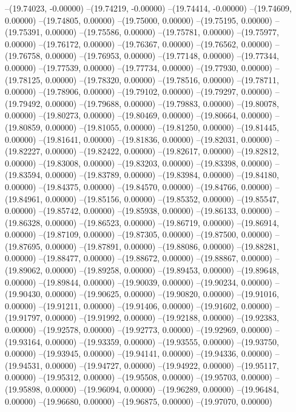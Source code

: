 --(19.74023, -0.00000)
--(19.74219, -0.00000)
--(19.74414, -0.00000)
--(19.74609, 0.00000)
--(19.74805, 0.00000)
--(19.75000, 0.00000)
--(19.75195, 0.00000)
--(19.75391, 0.00000)
--(19.75586, 0.00000)
--(19.75781, 0.00000)
--(19.75977, 0.00000)
--(19.76172, 0.00000)
--(19.76367, 0.00000)
--(19.76562, 0.00000)
--(19.76758, 0.00000)
--(19.76953, 0.00000)
--(19.77148, 0.00000)
--(19.77344, 0.00000)
--(19.77539, 0.00000)
--(19.77734, 0.00000)
--(19.77930, 0.00000)
--(19.78125, 0.00000)
--(19.78320, 0.00000)
--(19.78516, 0.00000)
--(19.78711, 0.00000)
--(19.78906, 0.00000)
--(19.79102, 0.00000)
--(19.79297, 0.00000)
--(19.79492, 0.00000)
--(19.79688, 0.00000)
--(19.79883, 0.00000)
--(19.80078, 0.00000)
--(19.80273, 0.00000)
--(19.80469, 0.00000)
--(19.80664, 0.00000)
--(19.80859, 0.00000)
--(19.81055, 0.00000)
--(19.81250, 0.00000)
--(19.81445, 0.00000)
--(19.81641, 0.00000)
--(19.81836, 0.00000)
--(19.82031, 0.00000)
--(19.82227, 0.00000)
--(19.82422, 0.00000)
--(19.82617, 0.00000)
--(19.82812, 0.00000)
--(19.83008, 0.00000)
--(19.83203, 0.00000)
--(19.83398, 0.00000)
--(19.83594, 0.00000)
--(19.83789, 0.00000)
--(19.83984, 0.00000)
--(19.84180, 0.00000)
--(19.84375, 0.00000)
--(19.84570, 0.00000)
--(19.84766, 0.00000)
--(19.84961, 0.00000)
--(19.85156, 0.00000)
--(19.85352, 0.00000)
--(19.85547, 0.00000)
--(19.85742, 0.00000)
--(19.85938, 0.00000)
--(19.86133, 0.00000)
--(19.86328, 0.00000)
--(19.86523, 0.00000)
--(19.86719, 0.00000)
--(19.86914, 0.00000)
--(19.87109, 0.00000)
--(19.87305, 0.00000)
--(19.87500, 0.00000)
--(19.87695, 0.00000)
--(19.87891, 0.00000)
--(19.88086, 0.00000)
--(19.88281, 0.00000)
--(19.88477, 0.00000)
--(19.88672, 0.00000)
--(19.88867, 0.00000)
--(19.89062, 0.00000)
--(19.89258, 0.00000)
--(19.89453, 0.00000)
--(19.89648, 0.00000)
--(19.89844, 0.00000)
--(19.90039, 0.00000)
--(19.90234, 0.00000)
--(19.90430, 0.00000)
--(19.90625, 0.00000)
--(19.90820, 0.00000)
--(19.91016, 0.00000)
--(19.91211, 0.00000)
--(19.91406, 0.00000)
--(19.91602, 0.00000)
--(19.91797, 0.00000)
--(19.91992, 0.00000)
--(19.92188, 0.00000)
--(19.92383, 0.00000)
--(19.92578, 0.00000)
--(19.92773, 0.00000)
--(19.92969, 0.00000)
--(19.93164, 0.00000)
--(19.93359, 0.00000)
--(19.93555, 0.00000)
--(19.93750, 0.00000)
--(19.93945, 0.00000)
--(19.94141, 0.00000)
--(19.94336, 0.00000)
--(19.94531, 0.00000)
--(19.94727, 0.00000)
--(19.94922, 0.00000)
--(19.95117, 0.00000)
--(19.95312, 0.00000)
--(19.95508, 0.00000)
--(19.95703, 0.00000)
--(19.95898, 0.00000)
--(19.96094, 0.00000)
--(19.96289, 0.00000)
--(19.96484, 0.00000)
--(19.96680, 0.00000)
--(19.96875, 0.00000)
--(19.97070, 0.00000)
